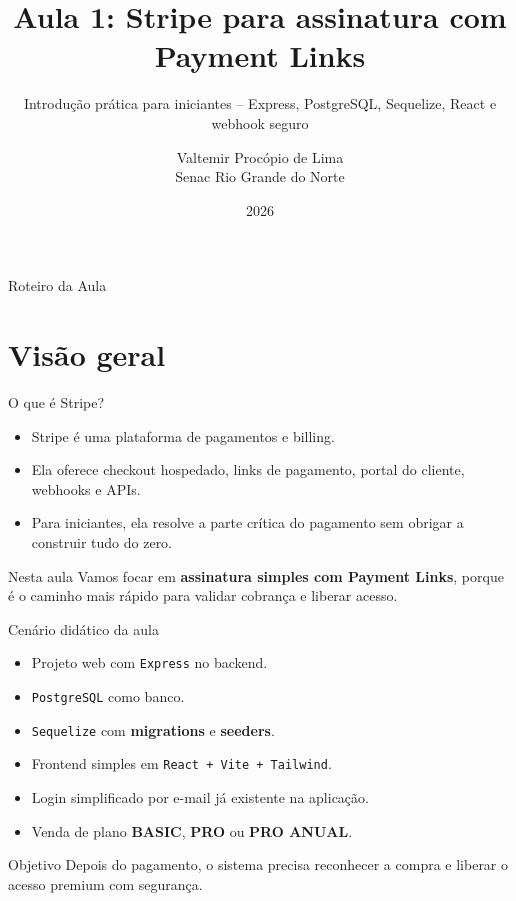 \documentclass[aspectratio=169]{beamer}
\title[Stripe - Aula 1]{Aula 1: Stripe para assinatura com Payment Links}
\subtitle{Introdução prática para iniciantes -- Express, PostgreSQL, Sequelize, React e webhook seguro}
\author[Valtemir Procópio]{Valtemir Procópio de Lima\\Senac Rio Grande do Norte}
\date[Stripe - 2026]{2026}
\newcommand{\code}[1]{\texttt{#1}}
\begin{document}
\begin{frame}[plain]
  \titlepage
\end{frame}

\begin{frame}{Roteiro da Aula}
\tableofcontents
\end{frame}

\section{Visão geral}

\begin{frame}{O que é Stripe?}
\begin{itemize}
  \item Stripe é uma plataforma de pagamentos e billing.
  \item Ela oferece checkout hospedado, links de pagamento, portal do cliente, webhooks e APIs.
  \item Para iniciantes, ela resolve a parte crítica do pagamento sem obrigar a construir tudo do zero.
\end{itemize}

\begin{block}{Nesta aula}
Vamos focar em \textbf{assinatura simples com Payment Links}, porque é o caminho mais rápido para validar cobrança e liberar acesso.
\end{block}
\end{frame}

\begin{frame}{Cenário didático da aula}
\begin{itemize}
  \item Projeto web com \code{Express} no backend.
  \item \code{PostgreSQL} como banco.
  \item \code{Sequelize} com \textbf{migrations} e \textbf{seeders}.
  \item Frontend simples em \code{React + Vite + Tailwind}.
  \item Login simplificado por e-mail já existente na aplicação.
  \item Venda de plano \textbf{BASIC}, \textbf{PRO} ou \textbf{PRO ANUAL}.
\end{itemize}

\begin{exampleblock}{Objetivo}
Depois do pagamento, o sistema precisa reconhecer a compra e liberar o acesso premium com segurança.
\end{exampleblock}
\end{frame}
\end{document}
